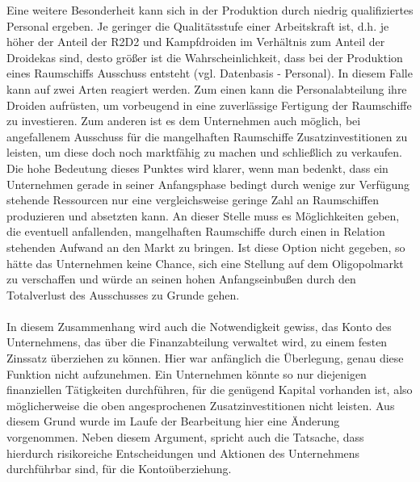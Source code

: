 Eine weitere Besonderheit kann sich in der Produktion durch niedrig qualifiziertes Personal ergeben. Je geringer die Qualitätsstufe einer Arbeitskraft ist, d.h. je höher der Anteil der R2D2 und Kampfdroiden im Verhältnis zum Anteil der Droidekas sind, desto größer ist die Wahrscheinlichkeit, dass bei der Produktion eines Raumschiffs Ausschuss entsteht (vgl. Datenbasis - Personal). In diesem Falle kann auf zwei Arten reagiert werden. Zum einen kann die Personalabteilung ihre Droiden aufrüsten, um vorbeugend in eine zuverlässige Fertigung der Raumschiffe zu investieren. Zum anderen ist es dem Unternehmen auch möglich, bei angefallenem Ausschuss für die mangelhaften Raumschiffe Zusatzinvestitionen zu leisten, um diese doch noch marktfähig zu machen und schließlich zu verkaufen. Die hohe Bedeutung dieses Punktes wird klarer, wenn man bedenkt, dass ein Unternehmen gerade in seiner Anfangsphase bedingt durch wenige zur Verfügung stehende Ressourcen nur eine vergleichsweise geringe Zahl an Raumschiffen produzieren und absetzten kann. An dieser Stelle muss es Möglichkeiten geben, die eventuell anfallenden, mangelhaften Raumschiffe durch einen in Relation stehenden Aufwand an den Markt zu bringen. Ist diese Option nicht gegeben, so hätte das Unternehmen keine Chance, sich eine Stellung auf dem Oligopolmarkt zu verschaffen und würde an seinen hohen Anfangseinbußen durch den Totalverlust des Ausschusses zu Grunde gehen. 
\\
\\
In diesem Zusammenhang wird auch die Notwendigkeit gewiss, das Konto des Unternehmens, das über die Finanzabteilung verwaltet wird, zu einem festen Zinssatz überziehen zu können. Hier war anfänglich die Überlegung, genau diese Funktion nicht aufzunehmen. Ein Unternehmen könnte so nur diejenigen finanziellen Tätigkeiten durchführen, für die genügend Kapital vorhanden ist, also möglicherweise die oben angesprochenen Zusatzinvestitionen nicht leisten. Aus diesem Grund wurde im Laufe der Bearbeitung hier eine Änderung vorgenommen.  Neben diesem Argument, spricht auch die Tatsache, dass hierdurch risikoreiche Entscheidungen und Aktionen des Unternehmens durchführbar sind, für die Kontoüberziehung.

\autorende{}
